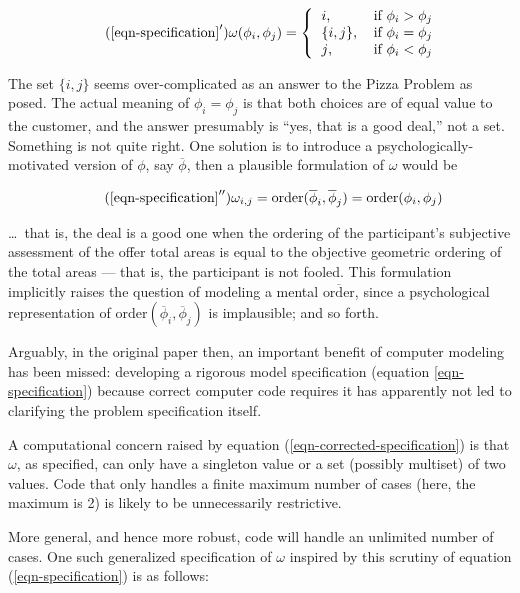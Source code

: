 \documentclass[11pt]{article}
\begin{document}
\begin{equation}\tag{$\ref{eqn-specification}^\prime$}\label{eqn-corrected-specification}
\omega(\phi_i,\phi_j)=\left\{\begin{tabular}{ll}
$i$,& if $\phi_i>\phi_j$\\
$\{i,j\}$,&if $\phi_i=\phi_j$\\
$j$,&if $\phi_i<\phi_j$\\
\end{tabular}\right.
\end{equation}

\def\psych{\overline{\phi}}
The set $\{i,j\}$ seems over-complicated as an answer to the Pizza Problem as posed. The actual meaning of $\phi_i=\phi_j$ is that both choices are of equal value to the customer, and the answer presumably is ``yes, that is a good deal,'' not a set. Something is not quite right. One solution is to introduce a psychologically-motivated version of $\phi$, say $\psych$, then a plausible formulation of $\omega$ would be

\def\order{\mbox{order}}
\begin{equation}\tag{$\ref{eqn-specification}^{\prime\prime}$}
\omega_{i,j}= \order(\psych_i, \psych_j) = \order(\phi_i,\phi_j)
\end{equation}

\ldots\ that is, the deal is a good one when the ordering of the participant's subjective assessment of the offer total areas is equal to the objective geometric ordering of the total areas --- that is, the participant is not fooled. This formulation implicitly raises the question of modeling a mental $\overline{\order}$, since a psychological representation of $\order(\psych_i, \psych_j)$ is implausible; and so forth.

Arguably, in the original paper then, an important benefit of computer modeling has been missed: developing a rigorous model specification (equation \ref{eqn-specification}) because correct computer code requires it has apparently not led to clarifying the problem specification itself.

A computational concern raised by equation (\ref{eqn-corrected-specification}) is that $\omega$, as specified, can only have a singleton value or a set (possibly multiset) of two values. Code that only handles a finite maximum number of cases (here, the maximum is 2) is likely to be unnecessarily restrictive. 

More general, and hence more robust, code will handle an unlimited number of cases. One such generalized specification of $\omega$ inspired by this scrutiny of equation (\ref{eqn-specification}) is as follows:
\end{document}
